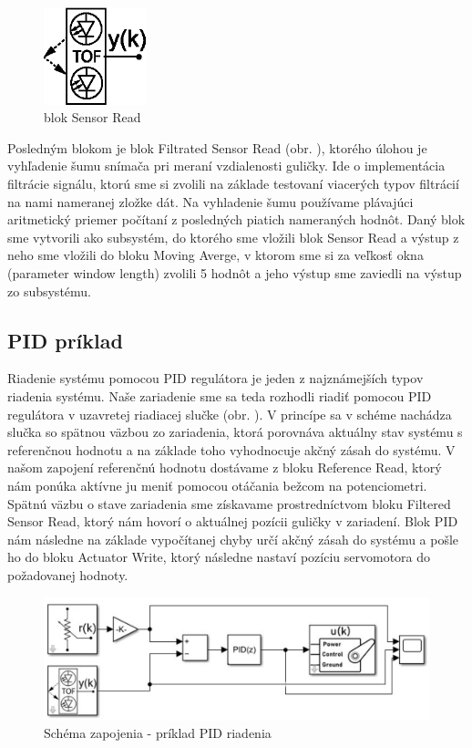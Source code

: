 \begin{figure}
	\centering
	\includegraphics[width=30mm]{obr/SensorRead.eps}
	\caption{blok Sensor Read}\label{OBRAZOK 3.1.3} 
\end{figure} 

Posledným blokom je blok Filtrated Sensor Read (obr. ), ktorého úlohou je vyhľadenie šumu snímača pri meraní vzdialenosti guličky. Ide o implementácia filtrácie signálu, ktorú sme si zvolili na základe testovaní viacerých typov filtrácií na nami nameranej zložke dát. Na vyhladenie šumu používame plávajúci aritmetický priemer počítaní z posledných piatich nameraných hodnôt. Daný blok sme vytvorili ako subsystém, do ktorého sme vložili blok Sensor Read a výstup z neho sme vložili do bloku Moving Averge, v ktorom sme si za veľkosť okna (parameter window length) zvolili 5 hodnôt a jeho výstup sme zaviedli na výstup zo subsystému. 


\subsection{PID príklad}
\label{kap:3.2.2}

Riadenie systému pomocou PID regulátora je jeden z najznámejších typov riadenia systému. Naše zariadenie sme sa teda rozhodli riadiť pomocou PID regulátora v uzavretej riadiacej slučke (obr. ). V princípe sa v schéme nachádza slučka so spätnou väzbou zo zariadenia, ktorá porovnáva aktuálny stav systému s referenčnou hodnotu a na základe toho vyhodnocuje akčný zásah do systému. V našom zapojení referenčnú hodnotu dostávame z bloku Reference Read,  ktorý nám ponúka aktívne ju meniť pomocou otáčania bežcom na potenciometri. Spätnú väzbu o stave zariadenia sme získavame prostredníctvom bloku Filtered Sensor Read, ktorý nám hovorí o aktuálnej pozícii guličky v zariadení. Blok PID nám následne na základe vypočítanej chyby určí akčný zásah do systému a pošle ho do bloku Actuator Write, ktorý následne nastaví pozíciu servomotora do požadovanej hodnoty.

\begin{figure}[h]
	\centering
	\includegraphics[width=130mm]{obr/PID.eps}
	\caption{Schéma zapojenia - príklad PID riadenia}\label{OBRAZOK 3.2.2.1} 
\end{figure} 

